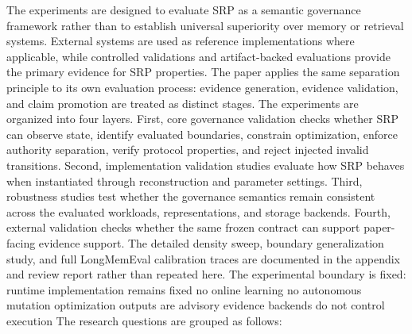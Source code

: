 {}
\markdownRendererSectionEnd 
\markdownRendererSectionEnd \markdownRendererSectionBegin
{}\markdownRendererInterblockSeparator
{}The experiments are designed to evaluate SRP as a semantic governance framework rather than to establish universal superiority over memory or retrieval systems. External systems are used as reference implementations where applicable, while controlled validations and artifact-backed evaluations provide the primary evidence for SRP properties.\markdownRendererParagraphSeparator
{}The paper applies the same separation principle to its own evaluation process: evidence generation, evidence validation, and claim promotion are treated as distinct stages.\markdownRendererParagraphSeparator
{}The experiments are organized into four layers. First, core governance validation checks whether SRP can observe state, identify evaluated boundaries, constrain optimization, enforce authority separation, verify protocol properties, and reject injected invalid transitions. Second, implementation validation studies evaluate how SRP behaves when instantiated through reconstruction and parameter settings. Third, robustness studies test whether the governance semantics remain consistent across the evaluated workloads, representations, and storage backends. Fourth, external validation checks whether the same frozen contract can support paper-facing evidence support.\markdownRendererParagraphSeparator
{}The detailed density sweep, boundary generalization study, and full LongMemEval calibration traces are documented in the appendix and review report rather than repeated here.\markdownRendererParagraphSeparator
{}The experimental boundary is fixed:\markdownRendererInterblockSeparator
{}\markdownRendererUlBeginTight
\markdownRendererUlItem runtime implementation remains fixed\markdownRendererUlItemEnd 
\markdownRendererUlItem no online learning\markdownRendererUlItemEnd 
\markdownRendererUlItem no autonomous mutation\markdownRendererUlItemEnd 
\markdownRendererUlItem optimization outputs are advisory\markdownRendererUlItemEnd 
\markdownRendererUlItem evidence backends do not control execution\markdownRendererUlItemEnd 
\markdownRendererUlEndTight \markdownRendererInterblockSeparator
{}The research questions are grouped as follows:\markdownRendererInterblockSeparator
{}\markdownRendererInterblockSeparator
